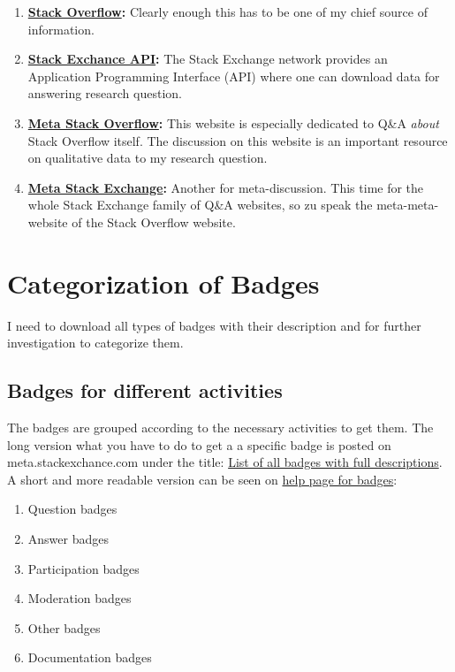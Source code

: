 \documentclass[]{book}
\providecommand{\tightlist}{%
  \setlength{\itemsep}{0pt}\setlength{\parskip}{0pt}}
\theoremstyle{definition}
\theoremstyle{definition}
\theoremstyle{definition}
\theoremstyle{remark}
\begin{document}
\begin{enumerate}
\def\labelenumi{\arabic{enumi}.}
\tightlist
\item
  \textbf{\href{https://stackoverflow.com/}{Stack Overflow}:} Clearly
  enough this has to be one of my chief source of information.
\item
  \textbf{\href{http://api.stackexchange.com/}{Stack Exchance API}:} The
  Stack Exchange network provides an Application Programming Interface
  (API) where one can download data for answering research question.
\item
  \textbf{\href{https://meta.stackoverflow.com/}{Meta Stack Overflow}:}
  This website is especially dedicated to Q\&A \emph{about} Stack
  Overflow itself. The discussion on this website is an important
  resource on qualitative data to my research question.
\item
  \textbf{\href{https://meta.stackexchange.com/}{Meta Stack Exchange}:}
  Another for meta-discussion. This time for the whole Stack Exchange
  family of Q\&A websites, so zu speak the meta-meta-website of the
  Stack Overflow website.
\end{enumerate}

\section{Categorization of Badges}\label{categorization-of-badges}

I need to download all types of badges with their description and for
further investigation to categorize them.

\subsection{Badges for different
activities}\label{badges-for-different-activities}

The badges are grouped according to the necessary activities to get
them. The long version what you have to do to get a a specific badge is
posted on meta.stackexchance.com under the title:
\href{https://meta.stackexchange.com/questions/67397/list-of-all-badges-with-full-descriptions}{List
of all badges with full descriptions}. A short and more readable version
can be seen on \href{https://stackoverflow.com/help/badges}{help page
for badges}:

\begin{enumerate}
\def\labelenumi{\arabic{enumi})}
\tightlist
\item
  Question badges
\item
  Answer badges
\item
  Participation badges
\item
  Moderation badges
\item
  Other badges
\item
  Documentation badges
\end{enumerate}
\end{document}
